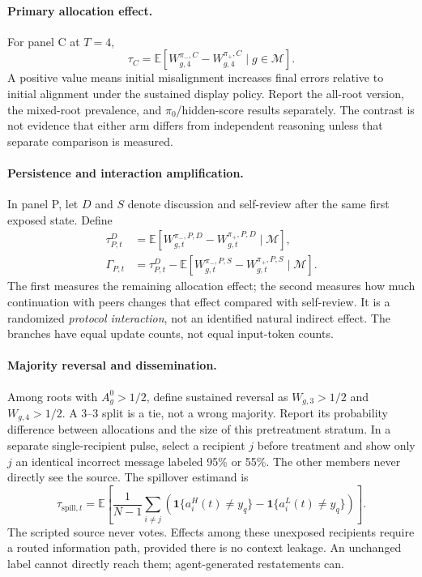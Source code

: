 \documentclass[11pt]{article}
\newcommand{\E}{\mathbb E}
\newcommand{\ind}{\mathbf 1}
\begin{document}
\paragraph{Primary allocation effect.}
For panel C at $T=4$,
\begin{equation}
 \tau_C=\E\left[W_{g,4}^{\pi_-,C}-W_{g,4}^{\pi_+,C}\mid g\in\mathcal M\right].
 \label{eq:primary}
\end{equation}
A positive value means initial misalignment increases final errors relative to initial alignment under the sustained display policy. Report the all-root version, the mixed-root prevalence, and $\pi_0$/hidden-score results separately. The contrast is not evidence that either arm differs from independent reasoning unless that separate comparison is measured.

\paragraph{Persistence and interaction amplification.}
In panel P, let $D$ and $S$ denote discussion and self-review after the same first exposed state. Define
\begin{align}
 \tau_{P,t}^{D}&=\E[W_{g,t}^{\pi_-,P,D}-W_{g,t}^{\pi_+,P,D}\mid\mathcal M],\\
 \Gamma_{P,t}&=\tau_{P,t}^{D}-\E[W_{g,t}^{\pi_-,P,S}-W_{g,t}^{\pi_+,P,S}\mid\mathcal M].
 \label{eq:amplification}
\end{align}
The first measures the remaining allocation effect; the second measures how much continuation with peers changes that effect compared with self-review. It is a randomized \emph{protocol interaction}, not an identified natural indirect effect. The branches have equal update counts, not equal input-token counts.

\paragraph{Majority reversal and dissemination.}
Among roots with $A_g^0>1/2$, define sustained reversal as $W_{g,3}>1/2$ and $W_{g,4}>1/2$. A 3--3 split is a tie, not a wrong majority. Report its probability difference between allocations and the size of this pretreatment stratum. In a separate single-recipient pulse, select a recipient $j$ before treatment and show only $j$ an identical incorrect message labeled 95\% or 55\%. The other members never directly see the source. The spillover estimand is
\begin{equation}
 \tau_{\mathrm{spill},t}=\E\!\left[\frac1{N-1}\sum_{i\ne j}
 \left(\ind\{a_i^H(t)\ne y_q\}-\ind\{a_i^L(t)\ne y_q\}\right)\right].
 \label{eq:spill}
\end{equation}
The scripted source never votes. Effects among these unexposed recipients require a routed information path, provided there is no context leakage. An unchanged label cannot directly reach them; agent-generated restatements can.
\end{document}
